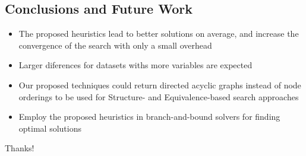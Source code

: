 \subsection{Conclusions and Future Work}
	\begin{frame}
		\begin{itemize}
			\item The proposed heuristics lead to better solutions on average, and increase the convergence of the search with only a small overhead
			\item Larger diferences for datasets withs more variables are expected
			\item Our proposed techniques could return directed acyclic graphs instead of node orderings to be used for Structure- and Equivalence-based search approaches
			\item Employ the proposed heuristics in branch-and-bound solvers for finding optimal solutions
		\end{itemize}
	\end{frame}

\begin{frame}
	\centering
	\LARGE{Thanks!}
\end{frame}